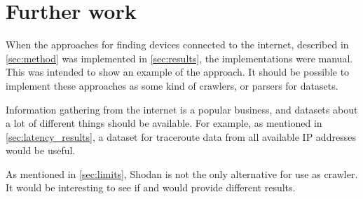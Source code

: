 \section{Further work} \label{sec:further_work}
When the approaches for finding devices connected to the internet, described in \cref{sec:method} was implemented in \cref{sec:results}, the implementations were manual. This was intended to show an example of the approach. It should be possible to implement these approaches as some kind of crawlers, or parsers for datasets.

Information gathering from the internet is a popular business, and datasets about a lot of different things should be available. For example, as mentioned in \cref{sec:latency_results}, a dataset for traceroute data from all available IP addresses would be useful. 

As mentioned in \cref{sec:limits}, Shodan is not the only alternative for use as crawler. It would be interesting to see if \href{https://censys.io/}{\color{blue}{Censys}}\cite{censys} and \href{www.zoomeye.org}{\color{blue}{ZoomEye}}\cite{zoomeye} would provide different results.
